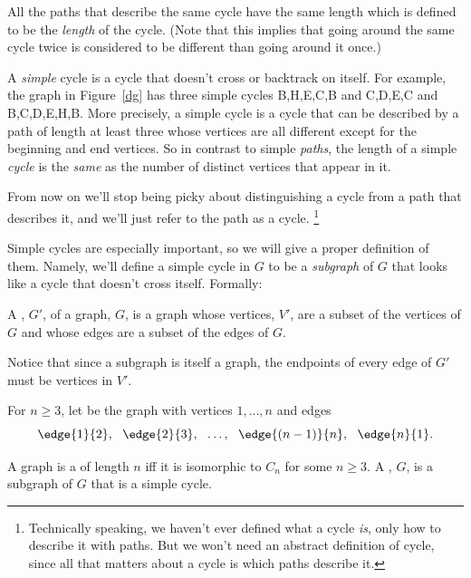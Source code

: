 All the paths that describe the same cycle have the same length which is
defined to be the {\em length} of the cycle.  (Note that this implies that
going around the same cycle twice is considered to be different than going
around it once.)

A \emph{simple} cycle is a cycle that doesn't cross or
backtrack on itself.  For example, the graph in Figure~\ref{dg} has three
simple cycles B,H,E,C,B and C,D,E,C and B,C,D,E,H,B.  More precisely, a
simple cycle is a cycle that can be described by a path of length at least
three whose vertices are all different except for the beginning and end
vertices.  So in contrast to simple \emph{paths}, the length of a simple
\emph{cycle} is the \emph{same} as the number of distinct vertices that
appear in it.

From now on we'll stop being picky about distinguishing a cycle from a
path that describes it, and we'll just refer to the path as a cycle.
\footnote{Technically speaking, we haven't ever defined what a cycle
\emph{is}, only how to describe it with paths.  But we won't need an
abstract definition of cycle, since all that matters about a cycle is which
paths describe it.}

Simple cycles are especially important, so we will give a proper
definition of them.  Namely, we'll define a simple cycle in $G$ to be a
\emph{subgraph} of $G$ that looks like a cycle that doesn't cross itself.
Formally:
\begin{definition}
A , $G'$, of a graph, $G$, is a graph whose vertices, $V'$,
are a subset of the vertices of $G$ and whose edges are a subset
of the edges of $G$.
\end{definition}
Notice that since a subgraph is itself a graph, the endpoints of every
edge of $G'$ must be vertices in $V'$.
\begin{definition}
  For $n \ge 3$, let  be the graph with vertices $1,\dots, n$
  and edges
\[
\edge{1}{2},\ \ \edge{2}{3},\ \ \dots,\ \ \edge{(n-1)}{n},\ \ \edge{n}{1}.
\]











A graph is a  of length $n$ iff it is isomorphic to $C_n$
for some $n \ge 3$.  A , $G$, is a subgraph
of $G$ that is a simple cycle.
\end{definition}

